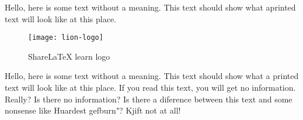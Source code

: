 \documentclass[../main.tex]{subfiles}
\begin{document}
 

Hello, here is some text without a meaning. This text should show what aprinted text will look like at this place.

\begin{figure}[bh]
\centering
\texttt{[image: lion-logo]}
\label{fig:img1}
\caption{ShareLaTeX learn logo}
\end{figure}

Hello, here is some text without a meaning.  This text should show what a printed text will look like at this place.  If you read this text, you will get no information.  Really?  Is there no information?  Is there a diference between this text and some nonsense like Huardest gefburn"?  Kjift  not at all!
\end{document}
